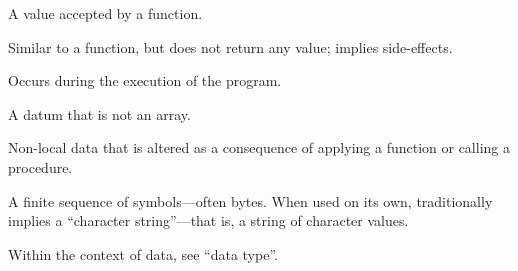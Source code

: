 \begin{description}
  A value accepted by a function.

  Similar to a function, but does not return any value; implies side-effects.

  Occurs during the execution of the program.

  A datum that is not an array.

  Non-local data that is altered as a consequence of applying a function or
  calling a procedure.

  A finite sequence of symbols---often bytes. When used on its own,
  traditionally implies a ``character string''---that is, a string of character
  values.

  Within the context of data, see ``data type''.
\end{description}
